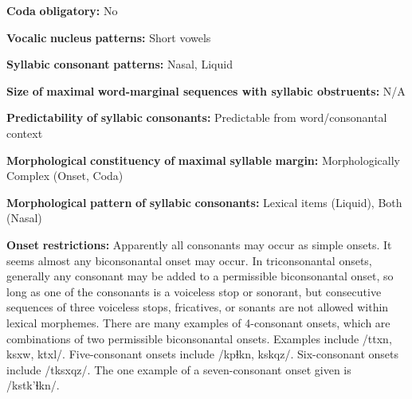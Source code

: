 \begin{styleBody}
\textbf{Coda} \textbf{obligatory:} No
\end{styleBody}

\begin{styleBody}
\textbf{Vocalic} \textbf{nucleus} \textbf{patterns:} Short vowels
\end{styleBody}

\begin{styleBody}
\textbf{Syllabic} \textbf{consonant} \textbf{patterns:} Nasal, Liquid
\end{styleBody}

\begin{styleBody}
\textbf{Size} \textbf{of} \textbf{maximal} \textbf{word{}-marginal sequences with syllabic obstruents:} N/A
\end{styleBody}

\begin{styleBody}
\textbf{Predictability} \textbf{of} \textbf{syllabic} \textbf{consonants:} Predictable from word/consonantal context
\end{styleBody}

\begin{styleBody}
\textbf{Morphological} \textbf{constituency} \textbf{of} \textbf{maximal} \textbf{syllable} \textbf{margin:} Morphologically Complex (Onset, Coda)
\end{styleBody}

\begin{styleBody}
\textbf{Morphological} \textbf{pattern} \textbf{of} \textbf{syllabic} \textbf{consonants:} Lexical items (Liquid), Both (Nasal)
\end{styleBody}

\begin{styleBody}
\textbf{Onset} \textbf{restrictions:} Apparently all consonants may occur as simple onsets. It seems almost any biconsonantal onset may occur. In triconsonantal onsets, generally any consonant may be added to a permissible biconsonantal onset, so long as one of the consonants is a voiceless stop or sonorant, but consecutive sequences of three voiceless stops, fricatives, or sonants are not allowed within lexical morphemes. There are many examples of 4-consonant onsets, which are combinations of two permissible biconsonantal onsets. Examples include /ttxn, ksxw, ktxl/. Five-consonant onsets include /kpɬkn, kskqz/. Six-consonant onsets include /tksxqz/. The one example of a seven-consonant onset given is /kstk’ɬkn/.
\end{styleBody}

